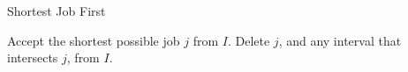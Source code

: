 \begin{algorithm}
\caption{Shortest Job First}
\begin{algorithmic}
  \STATE Accept the shortest possible job $j$ from $I$.
  \STATE Delete $j$, and any interval that intersects $j$, from $I$.
\ENDWHILE
\ENDPROCEDURE
\end{algorithmic}
\end{algorithm}